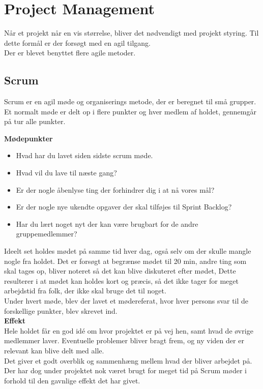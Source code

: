 \newpage
\section{Project Management}

Når et projekt når en vis størrelse, bliver det nødvendigt med projekt styring. Til dette formål er der forsøgt med en agil tilgang.\\

Der er blevet benyttet flere agile metoder.

\subsection{Scrum}

Scrum er en agil møde og organiserings metode, der er beregnet til små grupper. Et normalt møde er delt op i flere punkter og hver medlem af holdet, gennemgår på tur alle punkter.

\textbf{Mødepunkter}
\begin{itemize}
	\item Hvad har du lavet siden sidste scrum møde.
	\item Hvad vil du lave til næste gang?
	\item Er der nogle åbenlyse ting der forhindrer dig i at nå vores mål?
	\item Er der nogle nye ukendte opgaver der skal tilføjes til Sprint Backlog?
	\item Har du lært noget nyt der kan være brugbart for de andre gruppemedlemmer?
\end{itemize}

Ideelt set holdes mødet på samme tid hver dag, også selv om der skulle mangle nogle fra holdet.
Det er forsøgt at begrænse mødet til 20 min, andre ting som skal tages op, bliver noteret så det kan blive diskuteret efter mødet, Dette resulterer i at mødet kan holdes kort og præcis, så det ikke tager for meget arbejdstid fra folk, der ikke skal bruge det til noget.\\

Under hvert møde, blev der lavet et mødereferat, hvor hver persons svar til de forskellige punkter, blev skrevet ind.\\ %



\textbf{Effekt}\\

Hele holdet får en god idé om hvor projektet er på vej hen, samt hvad de øvrige medlemmer laver.
Eventuelle problemer bliver bragt frem, og ny viden der er relevant kan blive delt med alle.\\
Det giver et godt overblik og sammenhæng mellem hvad der bliver arbejdet på. Der har dog under projektet nok været brugt for meget tid på Scrum møder i forhold til den gavnlige effekt det har givet.


